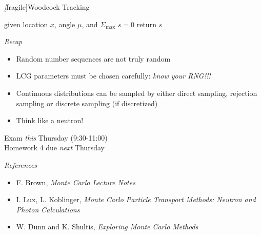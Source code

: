 \emph[fragile]{Woodcock Tracking}

\begin{algorithm}[H]
    given location $x$, angle $\mu$, and $\Sigma_{\text{max}}$\;
    $s = 0$ \;
    return $s$\;
\end{algorithm}



\emph{Recap}
  \begin{itemize}
   \item Random number sequences are not truly random
   \item LCG parameters must be chosen carefully: \emph{ know your RNG!!!}
   \item Continuous distributions can be sampled by either direct sampling, rejection sampling or discrete sampling (if discretized)
   \item Think like a neutron!
  \end{itemize}
  \vfill
  
  Exam \emph{ this} Thursday (9:30-11:00) \\
  Homework 4 due \emph{ next} Thursday


\emph{References}
 \begin{itemize}
  \item F. Brown, \emph{ Monte Carlo Lecture Notes} 
  \item I. Lux, L. Koblinger, \emph{ Monte Carlo Particle Transport Methods: Neutron and Photon Calculations}
  \item W. Dunn and K. Shultis, \emph{ Exploring Monte Carlo Methods}
 \end{itemize}

